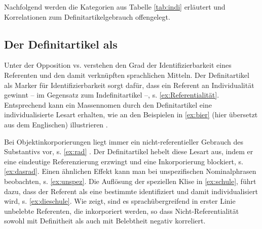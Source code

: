 Nachfolgend werden die Kategorien aus Tabelle \ref{tab:indi} erläutert und Korrelationen zum Definitartikelgebrauch offengelegt. 

\subsection{Der Definitartikel als } \label{sec:individualisierer} 

Unter der Opposition  vs.  verstehen \textcite{Hopper1980} den Grad der Identifizierbarkeit eines Referenten und den damit verknüpften sprachlichen Mitteln. Der Definitartikel als Marker für Identifizierbarkeit sorgt dafür, dass ein Referent an Individualität gewinnt -- im Gegensatz zum Indefinitartikel --, s. \ref{ex:Referentialität}. Entsprechend kann ein Massennomen durch den Definitartikel eine individualisierte Lesart erhalten, wie \textcite[253]{Hopper1980} an den Beispielen in \ref{ex:bier} (hier übersetzt aus dem Englischen) illustrieren \parencite[vgl. auch][257]{Leiss2000}.

\begin{exe}
	\ex \label{ex:Referentialität} 
\end{exe}

\begin{exe}
	\ex \label{ex:bier} 
\end{exe} 
\noindent
Bei Objektinkorporierungen liegt immer ein nicht-referentieller Gebrauch des Substantivs vor, s. \ref{ex:rad} \parencite[vgl. u.a.][]{Mithun1984}. Der Definitartikel hebelt diese Lesart aus, indem er eine eindeutige Referenzierung erzwingt und eine Inkorporierung blockiert, s. \ref{ex:dasrad}.  Einen ähnlichen Effekt kann man bei unspezifischen Nominalphrasen beobachten, s. \ref{ex:unspez}. Die Auflösung der speziellen Klise in \ref{ex:schule}, führt dazu, dass der Referent als eine bestimmte  identifiziert und damit individualisiert wird, s. \ref{ex:dieschule}. Wie \textcite[169]{Croft2006} zeigt, sind es sprachübergreifend in erster Linie unbelebte Referenten, die inkorporiert werden, so dass Nicht-Referentialität sowohl mit Definitheit als auch mit Belebtheit negativ korreliert.

\begin{exe}
	\ex \label{ex:inkorp}
	\begin{xlist}
		\ex \label{ex:rad} 
		\ex \label{ex:dasrad} 
	\end{xlist}
\end{exe} 

